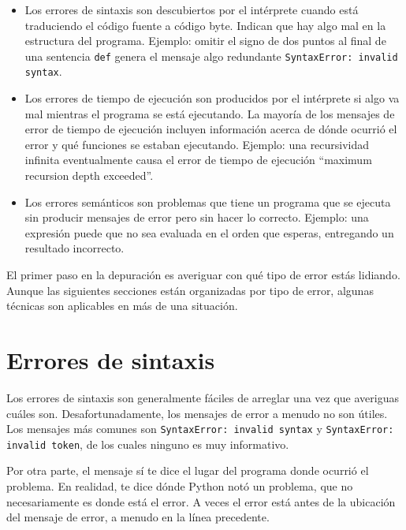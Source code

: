 \documentclass[10pt]{book}
\begin{document}
\begin{itemize}

\item Los errores de sintaxis son descubiertos por el intérprete cuando está
  traduciendo el código fuente a código byte.  Indican
  que hay algo mal en la estructura del programa.
  Ejemplo: omitir el signo de dos puntos al final de una sentencia {\tt def}
  genera el mensaje algo redundante {\tt SyntaxError: invalid
    syntax}.

\item Los errores de tiempo de ejecución son producidos por el intérprete si algo va
  mal mientras el programa se está ejecutando.  La mayoría de los mensajes de error de tiempo de ejecución
  incluyen información acerca de dónde ocurrió el error y qué
  funciones se estaban ejecutando.  Ejemplo: una recursividad infinita eventualmente
  causa el error de tiempo de ejecución ``maximum recursion depth exceeded''.

\item Los errores semánticos son problemas que tiene un programa que se ejecuta sin
  producir mensajes de error pero sin hacer lo correcto.  Ejemplo:
  una expresión puede que no sea evaluada en el orden que esperas, entregando
  un resultado incorrecto.

\end{itemize}

El primer paso en la depuración es averiguar con qué tipo de
error estás lidiando.  Aunque las siguientes secciones están
organizadas por tipo de error, algunas técnicas son
aplicables en más de una situación.


\section{Errores de sintaxis}

Los errores de sintaxis son generalmente fáciles de arreglar una vez que averiguas cuáles
son.  Desafortunadamente, los mensajes de error a menudo no son útiles.
Los mensajes más comunes son {\tt SyntaxError: invalid syntax} y
{\tt SyntaxError: invalid token}, de los cuales ninguno es muy informativo.

Por otra parte, el mensaje sí te dice el lugar del programa donde
ocurrió el problema.  En realidad, te dice dónde Python
notó un problema, que no necesariamente es donde está
el error.  A veces el error está antes de la ubicación del mensaje
de error, a menudo en la línea precedente.
\end{document}
